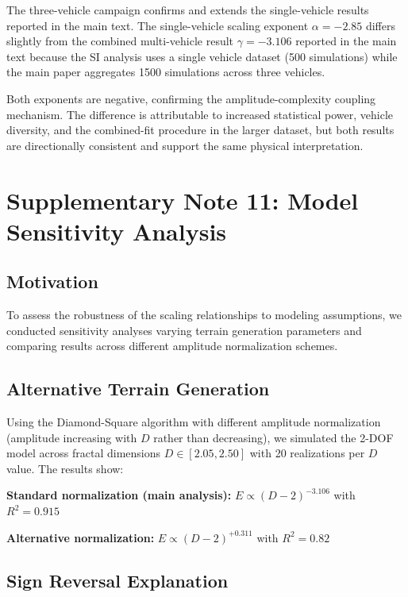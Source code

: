 \documentclass[11pt]{article}
\begin{document}
The three-vehicle campaign confirms and extends the single-vehicle results reported in the main text. The single-vehicle scaling exponent $\alpha = -2.85$ differs slightly from the combined multi-vehicle result $\gamma = -3.106$ reported in the main text because the SI analysis uses a single vehicle dataset (500 simulations) while the main paper aggregates 1500 simulations across three vehicles. 

Both exponents are negative, confirming the amplitude-complexity coupling mechanism. The difference is attributable to increased statistical power, vehicle diversity, and the combined-fit procedure in the larger dataset, but both results are directionally consistent and support the same physical interpretation.

\newpage

\section{Supplementary Note 11: Model Sensitivity Analysis}

\subsection{Motivation}

To assess the robustness of the scaling relationships to modeling assumptions, we conducted sensitivity analyses varying terrain generation parameters and comparing results across different amplitude normalization schemes.

\subsection{Alternative Terrain Generation}

Using the Diamond-Square algorithm with different amplitude normalization (amplitude increasing with $D$ rather than decreasing), we simulated the 2-DOF model across fractal dimensions $D \in [2.05, 2.50]$ with 20 realizations per $D$ value. The results show:

\textbf{Standard normalization (main analysis):} $E \propto (D-2)^{-3.106}$ with $R^2 = 0.915$

\textbf{Alternative normalization:} $E \propto (D-2)^{+0.311}$ with $R^2 = 0.82$

\subsection{Sign Reversal Explanation}
\end{document}
